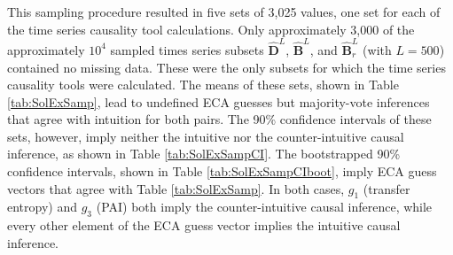 This sampling procedure resulted in five sets of 3,025 values, one set for each of the time series causality tool calculations.  Only approximately 3,000 of the approximately $10^4$ sampled times series subsets $\hat{\mathbf{D}}^L$, $\hat{\mathbf{B}}^L$, and $\hat{\mathbf{B}}^L_r$ (with $L=500$) contained no missing data.  These were the only subsets for which the time series causality tools were calculated.  The means of these sets, shown in Table \ref{tab:SolExSamp}, lead to undefined ECA guesses but majority-vote inferences that agree with intuition for both pairs. The 90\% confidence intervals of these sets, however, imply neither the intuitive nor the counter-intuitive causal inference, as shown in Table \ref{tab:SolExSampCI}.  The bootstrapped 90\% confidence intervals, shown in Table \ref{tab:SolExSampCIboot}, imply ECA guess vectors that agree with Table \ref{tab:SolExSamp}.  In both cases, $g_1$ (transfer entropy) and $g_3$ (PAI) both imply the counter-intuitive causal inference, while every other element of the ECA guess vector implies the intuitive causal inference. 

